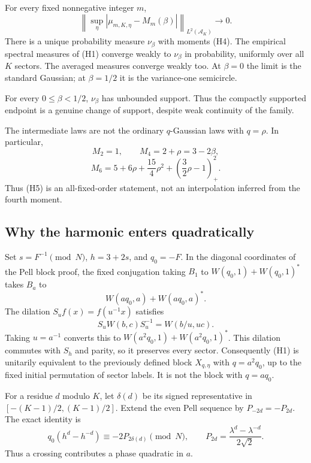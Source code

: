 \begin{theorem}\label{pass1:pell_harmonic_transition-1} For every fixed nonnegative integer \(m\),
\[
 \left\|\sup_\eta|\mu_{m,K,\eta}-M_m(\beta)|\right\|_{L^2(\mathcal A_K)}
       \longrightarrow0.                                     \tag{H5}
\]
There is a unique probability measure \(\nu_\beta\) with moments (H4).
The empirical spectral measures of (H1) converge weakly to \(\nu_\beta\) in
probability, uniformly over all \(K\) sectors. The averaged measures converge
weakly too. At \(\beta=0\) the limit is the standard Gaussian; at \(\beta=1/2\)
it is the variance-one semicircle.
\end{theorem}

For every \(0\le\beta<1/2\), \(\nu_\beta\) has unbounded support. Thus the
compactly supported endpoint is a genuine change of support, despite weak
continuity of the family.

The intermediate laws are not the ordinary \(q\)-Gaussian laws with
\(q=\rho\). In particular,
\[
 M_2=1,\qquad M_4=2+\rho=3-2\beta,
\]
\[
 M_6=5+6\rho+\frac{15}{4}\rho^2+
                         \left(\frac32\rho-1\right)_+^2.        \tag{H6}
\]
Thus (H5) is an all-fixed-order statement, not an interpolation inferred
from the fourth moment.

\hypertarget{pell-harmonic-why-the-harmonic-enters-quadratically}{%
\subsection{Why the harmonic enters quadratically}\label{pell-harmonic-why-the-harmonic-enters-quadratically}}

Set \(s=F^{-1}\pmod N\), \(h=3+2s\), and \(q_0=-F\). In the diagonal coordinates
of the Pell block proof, the fixed conjugation taking \(B_1\) to
\(W(q_0,1)+W(q_0,1)^*\) takes \(B_a\) to
\[
 W(aq_0,a)+W(aq_0,a)^*.
\]
The dilation \(S_u f(x)=f(u^{-1}x)\) satisfies
\[
 S_uW(b,c)S_u^{-1}=W(b/u,uc).
\]
Taking \(u=a^{-1}\) converts this to \(W(a^2q_0,1)+W(a^2q_0,1)^*\).
This dilation commutes with \(S_h\) and parity, so it preserves every sector.
Consequently (H1) is unitarily equivalent to the previously defined block
\(X_{q,\eta}\) with \(q=a^2q_0\), up to the fixed initial permutation of sector
labels. It is not the block with \(q=aq_0\).

For a residue \(d\) modulo \(K\), let \(\delta(d)\) be its signed representative
in \([-(K-1)/2,(K-1)/2]\). Extend the even Pell sequence by
\(P_{-2d}=-P_{2d}\). The exact identity is
\[
 q_0(h^d-h^{-d})\equiv-2P_{2\delta(d)}\pmod N,\qquad
 P_{2d}=\frac{\lambda^d-\lambda^{-d}}{2\sqrt2}.                  \tag{H7}
\]
Thus a crossing contributes a phase quadratic in \(a\).

